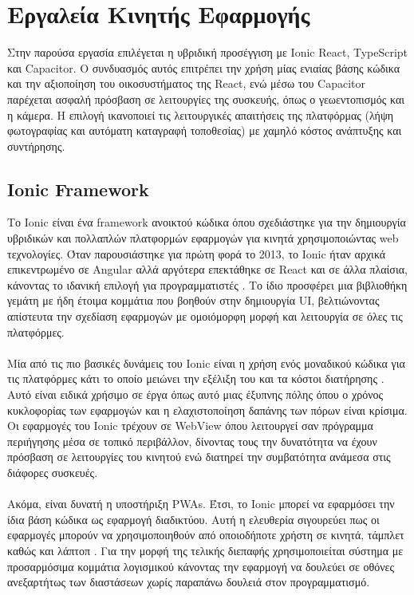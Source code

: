 \section{Εργαλεία Κινητής Εφαρμογής}
Στην παρούσα εργασία επιλέγεται η υβριδική προσέγγιση με Ionic React, TypeScript και Capacitor. Ο συνδυασμός αυτός επιτρέπει την χρήση μίας ενιαίας βάσης κώδικα και την αξιοποίηση του οικοσυστήματος της React, ενώ μέσω του Capacitor παρέχεται ασφαλή πρόσβαση σε λειτουργίες της συσκευής, όπως ο γεωεντοπισμός και η κάμερα. Η επιλογή ικανοποιεί τις λειτουργικές απαιτήσεις της πλατφόρμας (λήψη φωτογραφίας και αυτόματη καταγραφή τοποθεσίας) με χαμηλό κόστος ανάπτυξης και συντήρησης.

\subsection{Ionic Framework}
Το Ionic είναι ένα framework ανοικτού κώδικα όπου σχεδιάστηκε για την δημιουργία υβριδικών και πολλαπλών πλατφορμών εφαρμογών για κινητά χρησιμοποιώντας web τεχνολογίες. Όταν παρουσιάστηκε για πρώτη φορά το 2013, το Ionic ήταν αρχικά επικεντρωμένο σε Angular αλλά αργότερα επεκτάθηκε σε React και σε άλλα πλαίσια, κάνοντας το ιδανική επιλογή για προγραμματιστές \parencite{Ionicframework}. Το ίδιο προσφέρει μια βιβλιοθήκη γεμάτη με ήδη έτοιμα κομμάτια που βοηθούν στην δημιουργία UI, βελτιώνοντας απίστευτα την σχεδίαση εφαρμογών με ομοιόμορφη μορφή και λειτουργία σε όλες τις πλατφόρμες. 
\\
\\
Μία από τις πιο βασικές δυνάμεις του Ionic είναι η χρήση ενός μοναδικού κώδικα για τις πλατφόρμες κάτι το οποίο μειώνει την εξέλιξη του και τα κόστοι διατήρησης \parencite{Sonar2023Hybrid}. Αυτό είναι ειδικά χρήσιμο σε έργα όπως αυτό μιας έξυπνης πόλης όπου ο χρόνος κυκλοφορίας των εφαρμογών και η ελαχιστοποίηση δαπάνης των πόρων είναι κρίσιμα. Οι εφαρμογές του Ionic τρέχουν σε WebView όπου λειτουργεί σαν πρόγραμμα περιήγησης μέσα σε τοπικό περιβάλλον, δίνοντας τους την δυνατότητα να έχουν πρόσβαση σε λειτουργίες του κινητού ενώ διατηρεί την συμβατότητα ανάμεσα στις διάφορες συσκευές.
\\
\\
Ακόμα, είναι δυνατή η υποστήριξη PWAs. Έτσι, το Ionic μπορεί να εφαρμόσει την ίδια βάση κώδικα ως εφαρμογή διαδικτύου. Αυτή η ελευθερία σιγουρεύει πως οι εφαρμογές μπορούν να χρησιμοποιηθούν από οποιοδήποτε χρήστη σε κινητά, τάμπλετ καθώς και λάπτοπ \parencite{Ionicframework}. Για την μορφή της τελικής διεπαφής χρησιμοποιείται σύστημα με προσαρμόσιμα κομμάτια λογισμικού κάνοντας την εφαρμογή να δουλεύει σε οθόνες ανεξαρτήτως των διαστάσεων χωρίς παραπάνω δουλειά στον προγραμματισμό.

